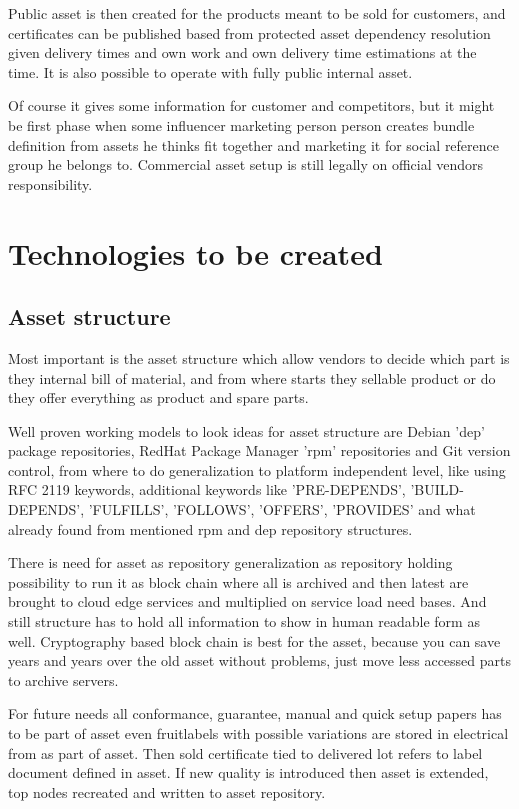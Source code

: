 Public asset is then created for the products meant to be sold for customers,
and certificates can be published based from protected asset dependency
resolution given delivery times and own work and own delivery time estimations
at the time. It is also possible to operate with fully public internal asset.

Of course it gives some information for customer and competitors, but it might
be first phase when some influencer marketing person person creates bundle
definition from assets he thinks fit together and marketing it for social
reference group he belongs to. Commercial asset setup is still legally on
official vendors responsibility.

\section{Technologies to be created}
\label{technologies created}
\subsection{Asset structure}\label{asset_structure}
Most important is the asset structure which allow vendors to decide which part
is they internal bill of material, and from where starts they sellable product
or do they offer everything as product and spare parts.

Well proven working models to look ideas for asset structure are Debian 'dep'
package repositories\allowbreak\cite{DebianPolicyManualRelationships}, RedHat
Package Manager 'rpm' repositories and Git version control, from where to do
generalization to platform independent level, like using RFC
2119\allowbreak\cite{rfc2119} keywords, additional keywords like
'PRE-DEPENDS', 'BUILD-DEPENDS', 'FULFILLS', 'FOLLOWS', 'OFFERS', 'PROVIDES'
and what already found from mentioned rpm and dep repository structures.

There is need for asset as repository generalization as repository holding
possibility to run it as block chain where all is archived and then latest are
brought to cloud edge services and multiplied on service load need bases. And
still structure has to hold all information to show in human readable form as
well. Cryptography based block chain is best for the asset, because you can
save years and years over the old asset without problems, just move less
accessed parts to archive servers.

For future needs all conformance, guarantee, manual and quick setup papers has
to be part of asset even fruitlabels with possible variations are stored in
electrical from as part of asset. Then sold certificate tied to delivered lot
refers to label document defined in asset. If new quality is introduced then
asset is extended, top nodes recreated and written to asset repository.

